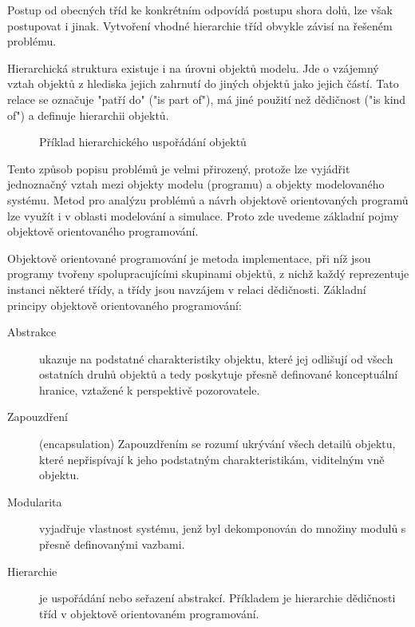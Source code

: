 \documentclass[a4paper]{article}
\begin{document}
Postup od obecných tříd ke konkrétním odpovídá postupu shora
dolů, lze však postupovat i jinak. Vytvoření vhodné hierarchie
tříd obvykle závisí na řešeném problému.

Hierarchická struktura existuje i na úrovni objektů modelu. Jde
o vzájemný vztah objektů z hlediska jejich zahrnutí do jiných
objektů jako jejich částí. Tato relace se označuje "patří do"
("is part of"), má jiné použití než dědičnost ("is kind of")
a definuje hierarchii objektů.


\begin{figure}[ht]
  \begin{center}
    \caption{Příklad hierarchického uspořádání objektů}
    \label{o1}
  \end{center}
\end{figure}

Tento způsob popisu problémů je velmi přirozený, protože lze
vyjádřit jednoznačný vztah mezi objekty modelu (programu)
a objekty modelovaného systému. Metod pro analýzu problémů
a návrh objektově orientovaných programů lze využít i v oblasti
modelování a simulace. Proto zde uvedeme základní pojmy
objektově orientovaného programování.

Objektově orientované programování je metoda implementace, při
níž jsou programy tvořeny spolupracujícími skupinami objektů,
z nichž každý reprezentuje instanci některé třídy, a třídy jsou
navzájem v relaci dědičnosti. Základní principy objektově
orientovaného programování:

\begin{description}
\item[Abstrakce]
 ukazuje na podstatné charakteristiky objektu, které
jej odlišují od všech ostatních druhů objektů a tedy poskytuje
přesně definované konceptuální hranice, vztažené k perspektivě
pozorovatele.

\item[Zapouzdření]  (encapsulation)
Zapouzdřením se rozumí ukrývání všech detailů objektu, které
nepřispívají k jeho podstatným charakteristikám, viditelným vně
objektu.

\item[Modularita]
vyjadřuje vlastnost systému, jenž byl dekomponován do
množiny modulů s přesně definovanými vazbami.

\item[Hierarchie]
 je uspořádání nebo seřazení abstrakcí. Příkladem je
hierarchie dědičnosti tříd v objektově orientovaném
programování.
\end{description}
\end{document}
